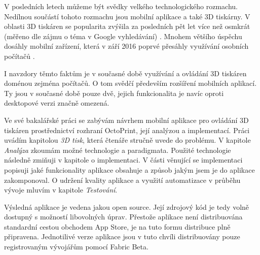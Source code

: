 V posledních letech můžeme být svědky velkého technologického rozmachu.
Nedílnou součástí tohoto rozmachu jsou mobilní aplikace a také 3D tiskárny.
V oblasti 3D tiskáren se popularita zvýšila za posledních pět let více než osmkrát (měřeno dle zájmu o téma v Google vyhledávání) \cite{3d-print-google-trends}.
Mnohem většího úspěchu dosáhly mobilní zařízení, která v září 2016 poprvé přesáhly využívání osobních počítačů \cite{mobile-devices-market-share}.

I navzdory těmto faktům je v současné době využívání a ovládání 3D tiskáren doménou zejména počítačů.
O tom svědčí především rozšíření mobilních aplikací.
Ty jsou v současné době pouze dvě, jejich funkcionalita je navíc oproti desktopové verzi značně omezená.

Ve své bakalářské práci se zabývám návrhem mobilní aplikace pro ovládání 3D tiskáren prostřednictví rozhraní OctoPrint, její analýzou a implementací.
Práci uvádím kapitolou \textit{3D tisk}, která čtenáře stručně uvede do problému.
V kapitole \textit{Analýza} zkoumám možné technologie a paradigmata.
Použité technologie následně zmiňuji v kapitole o implementaci.
V části věnující se implementaci popisuji jaké funkcionality aplikace obsahuje a způsob jakým jsem je do aplikace zakomponoval.
O udržení kvality aplikace a využití automatizace v průběhu vývoje mluvím v kapitole \textit{Testování}.

Výsledná aplikace je vedena jakou open source.
Její zdrojový kód je tedy volně dostupný s možností libovolných úprav.
Přestože aplikace není distribuována standardní cestou obchodem App Store, je na tuto formu distribuce plně připravena.
Jednotilivé verze aplikace jsou v tuto chvíli distribuovány pouze registrovaným vývojářům pomocí Fabric Beta.
